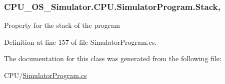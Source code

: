 \hypertarget{class_c_p_u___o_s___simulator_1_1_c_p_u_1_1_simulator_program_ac6065e57e8d108a0aefd27840f3bf01c}{}
\subsubsection[{Stack}]{ C\+P\+U\+\_\+\+O\+S\+\_\+\+Simulator.\+C\+P\+U.\+Simulator\+Program.\+Stack\hspace{0.3cm}{\ttfamily [get]}, {\ttfamily [set]}}\label{class_c_p_u___o_s___simulator_1_1_c_p_u_1_1_simulator_program_ac6065e57e8d108a0aefd27840f3bf01c}


Property for the stack of the program 



Definition at line 157 of file Simulator\+Program.\+cs.



The documentation for this class was generated from the following file\+:\begin{DoxyCompactItemize}
\item 
C\+P\+U/\hyperlink{_simulator_program_8cs}{Simulator\+Program.\+cs}\end{DoxyCompactItemize}
